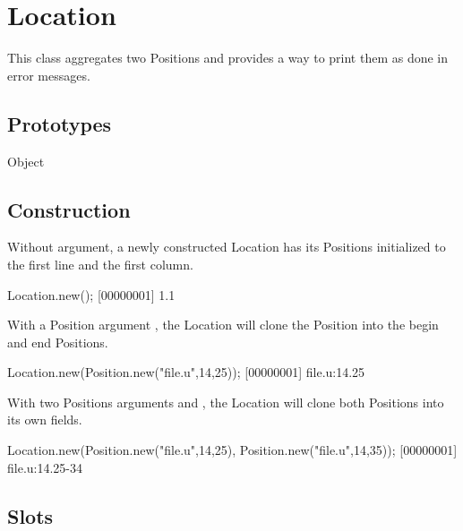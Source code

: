
\section{Location}

This class aggregates two Positions and provides a way to print them as done
in error messages.

\subsection{Prototypes}
\begin{refObjects}
\item[Object]
\end{refObjects}

\subsection{Construction}

Without argument, a newly constructed Location has its Positions initialized
to the first line and the first column.

\begin{urbiscript}[firstnumber=1]
Location.new();
[00000001] 1.1
\end{urbiscript}

With a Position argument , the Location will clone the Position into
the begin and end Positions.

\begin{urbiscript}[firstnumber=1]
Location.new(Position.new("file.u",14,25));
[00000001] file.u:14.25
\end{urbiscript}

With two Positions arguments  and , the Location will
clone both Positions into its own fields.

\begin{urbiscript}[firstnumber=1]
Location.new(Position.new("file.u",14,25), Position.new("file.u",14,35));
[00000001] file.u:14.25-34
\end{urbiscript}

\subsection{Slots}

